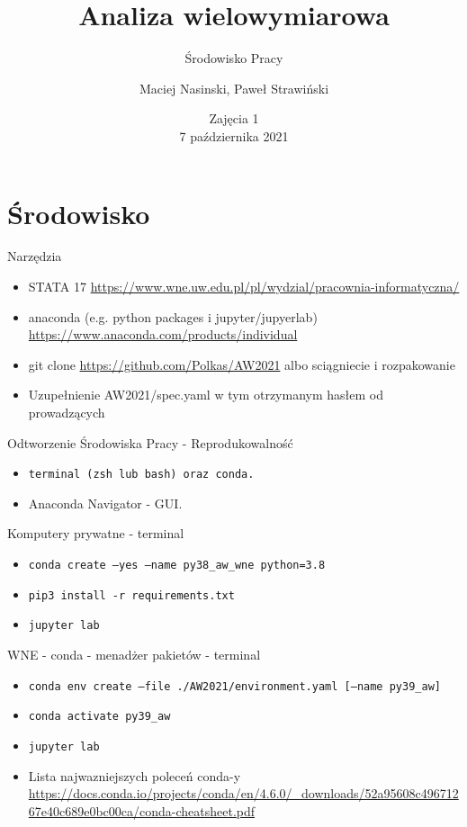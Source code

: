 \documentclass{beamer}
\begin{document}
\begin{frame}
\title[Tytuł]{Analiza wielowymiarowa}
\subtitle{Środowisko Pracy}
\author{Maciej Nasinski, Paweł Strawiński}
\date{Zajęcia 1 \\ 7 października 2021}
\titlepage
\end{frame}

\section{Środowisko}

\begin{frame}{Narzędzia}
  \begin{itemize}
  \item STATA 17 \url{https://www.wne.uw.edu.pl/pl/wydzial/pracownia-informatyczna/}
  \item anaconda (e.g. python packages i jupyter/jupyerlab) \url{https://www.anaconda.com/products/individual}
  \item git clone \url{https://github.com/Polkas/AW2021} albo sciągniecie i rozpakowanie
  \item Uzupełnienie AW2021/spec.yaml w tym otrzymanym hasłem od prowadzących
  \end{itemize}
\end{frame}

\begin{frame}{Odtworzenie Środowiska Pracy - Reprodukowalność}
  \begin{itemize}
  \item \texttt{terminal (zsh lub bash) oraz conda.}
  \item Anaconda Navigator - GUI.
  \end{itemize}
\end{frame}

\begin{frame}{Komputery prywatne - terminal}
  \begin{itemize}
  \item \texttt{conda create --yes --name py38\_aw\_wne python=3.8} 
  \item \texttt{pip3 install -r requirements.txt}
  \item \texttt{jupyter lab}
  \end{itemize}
\end{frame}

\begin{frame}{WNE - conda - menadżer pakietów - terminal}
\begin{itemize}
  \item \texttt{conda env create --file ./AW2021/environment.yaml [--name py39\_aw]}
  \item \texttt{conda activate py39\_aw}
  \item \texttt{jupyter lab}
  \item Lista najwazniejszych poleceń conda-y \url{https://docs.conda.io/projects/conda/en/4.6.0/_downloads/52a95608c49671267e40c689e0bc00ca/conda-cheatsheet.pdf}
  \end{itemize}
\end{frame}
\end{document}
